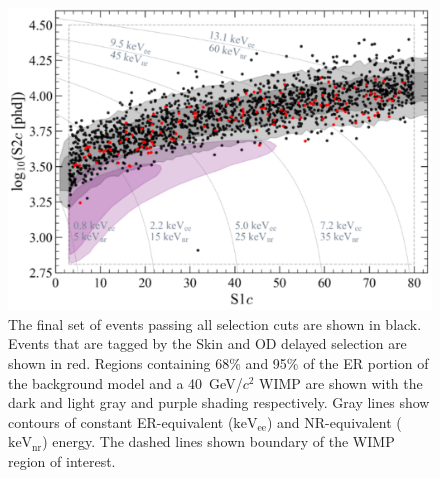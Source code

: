 \begin{figure}[ht!]
    \centering
    \includegraphics[width=0.7\linewidth]{figures/VetoEfficiency/WS2024VetoSideBandEvents_WIMP40.png}
    \caption[Final set of events passing all selection cuts in the WS2024 dataset with events tagged by the OD and Skin overlaid.]{The final set of events passing all selection cuts are shown in black. Events that are tagged by the Skin and OD delayed selection are shown in red. Regions containing 68\% and 95\% of the ER portion of the background model and a 40~GeV/$c^2$ WIMP are shown with the dark and light gray and purple shading respectively. Gray lines show contours of constant ER-equivalent ($\text{keV}_\text{ee}$) and NR-equivalent ($\text{keV}_\text{nr}$) energy. The dashed lines shown boundary of the WIMP region of interest.}
    \label{fig:VetoEff/VetoSideBandEvents}
\end{figure}

\pagebreak
